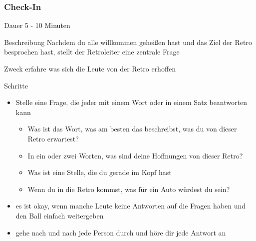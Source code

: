 \subsubsection{Check-In}
\begin{Beschreibungfett}[Beschreibung]
  \item [Dauer] 5 - 10 Minuten
  \item [Beschreibung] Nachdem du alle willkommen geheißen hast und das Ziel der Retro besprochen hast, stellt der Retroleiter eine zentrale Frage
  \item [Zweck] erfahre was sich die Leute von der Retro erhoffen
  \item [Schritte]
    \begin{itemize}
      \item Stelle eine Frage, die jeder mit einem Wort oder in einem Satz beantworten kann
        \begin{itemize}
          \item Was ist das Wort, was am besten das beschreibst, was du von dieser Retro
            erwartest?
          \item In ein oder zwei Worten, was sind deine Hoffnungen von dieser Retro?
          \item Was ist eine Stelle, die du gerade im Kopf hast
          \item Wenn du in die Retro kommst, was für ein Auto würdest du sein?
        \end{itemize}
      \item es ist okay, wenn manche Leute keine Antworten auf die Fragen haben und den Ball
        einfach weitergeben
      \item gehe nach und nach jede Person durch und höre dir jede Antwort an
    \end{itemize}
\end{Beschreibungfett}


